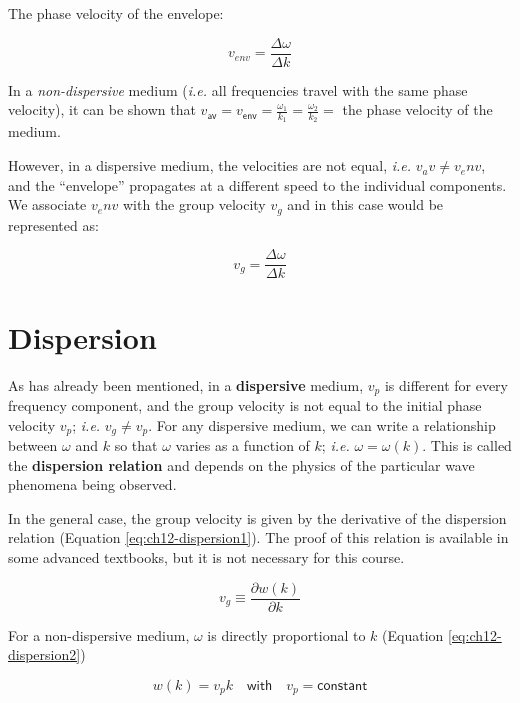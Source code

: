 \documentclass[
]{book}
\begin{document}
The phase velocity of the envelope:

\begin{equation}
v_{env} = \frac{\Delta\omega}{\Delta k}
\end{equation}

In a \emph{non-dispersive} medium (\emph{i.e.} all frequencies travel with the same phase velocity), it can be shown that \(v_{\textsf{av}} = v_{\textsf{env}} = \frac{\omega_1}{k_1} = \frac{\omega_2}{k_2} =\) the phase velocity of the medium.

However, in a dispersive medium, the velocities are not equal, \emph{i.e.} \(v_av \neq v_env\), and the ``envelope'' propagates at a different speed to the individual components. We associate \(v_env\) with the group velocity \(v_g\) and in this case would be represented as:

\begin{equation}
v_{g} = \frac{\Delta\omega}{\Delta k}
\end{equation}

\hypertarget{sec:ch12-dispersion}{%
\section{Dispersion}\label{sec:ch12-dispersion}}

As has already been mentioned, in a \textbf{dispersive} medium, \(v_p\) is different for every frequency component, and the group velocity is not equal to the initial phase velocity \(v_p\); \emph{i.e.} \(v_g \neq v_p\). For any dispersive medium, we can write a relationship between \(\omega\) and \(k\) so that \(\omega\) varies as a function of \(k\); \emph{i.e.} \(\omega = \omega(k)\). This is called the \textbf{dispersion relation} and depends on the physics of the particular wave phenomena being observed.

In the general case, the group velocity is given by the derivative of the dispersion relation (Equation \eqref{eq:ch12-dispersion1}). The proof of this relation is available in some advanced textbooks, but it is not necessary for this course.

\begin{equation}
v_g \equiv \frac{\partial w(k)}{\partial k}
\label{eq:ch12-dispersion1}
\end{equation}

For a non-dispersive medium, \(\omega\) is directly proportional to \(k\) (Equation \eqref{eq:ch12-dispersion2})

\begin{equation}
w(k) = v_p k \quad \textsf{with} \quad v_p = \textsf{constant}
\label{eq:ch12-dispersion2}
\end{equation}
\end{document}
